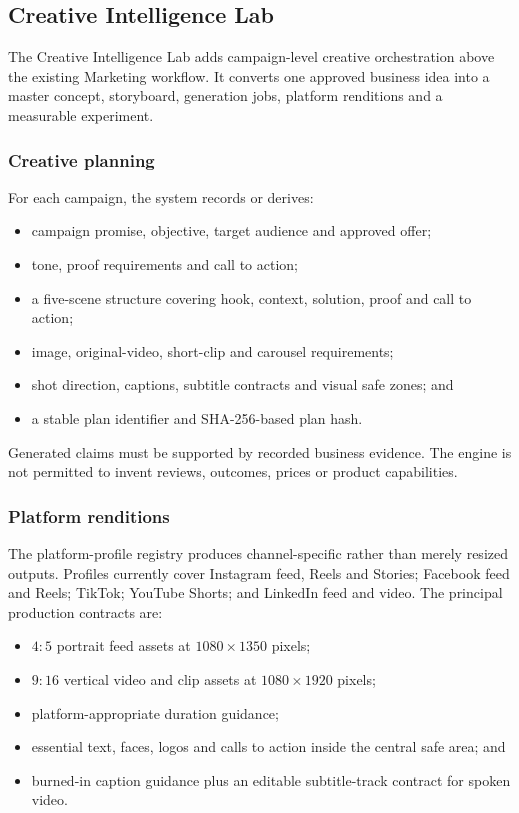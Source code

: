 \subsection{Creative Intelligence Lab}

The Creative Intelligence Lab adds campaign-level creative orchestration above
the existing Marketing workflow. It converts one approved business idea into a
master concept, storyboard, generation jobs, platform renditions and a measurable
experiment.

\subsubsection{Creative planning}

For each campaign, the system records or derives:

\begin{itemize}
    \item campaign promise, objective, target audience and approved offer;
    \item tone, proof requirements and call to action;
    \item a five-scene structure covering hook, context, solution, proof and call
    to action;
    \item image, original-video, short-clip and carousel requirements;
    \item shot direction, captions, subtitle contracts and visual safe zones; and
    \item a stable plan identifier and SHA-256-based plan hash.
\end{itemize}

Generated claims must be supported by recorded business evidence. The engine is
not permitted to invent reviews, outcomes, prices or product capabilities.

\subsubsection{Platform renditions}

The platform-profile registry produces channel-specific rather than merely
resized outputs. Profiles currently cover Instagram feed, Reels and Stories;
Facebook feed and Reels; TikTok; YouTube Shorts; and LinkedIn feed and video.
The principal production contracts are:

\begin{itemize}
    \item $4{:}5$ portrait feed assets at $1080\times1350$ pixels;
    \item $9{:}16$ vertical video and clip assets at $1080\times1920$ pixels;
    \item platform-appropriate duration guidance;
    \item essential text, faces, logos and calls to action inside the central safe
    area; and
    \item burned-in caption guidance plus an editable subtitle-track contract for
    spoken video.
\end{itemize}

